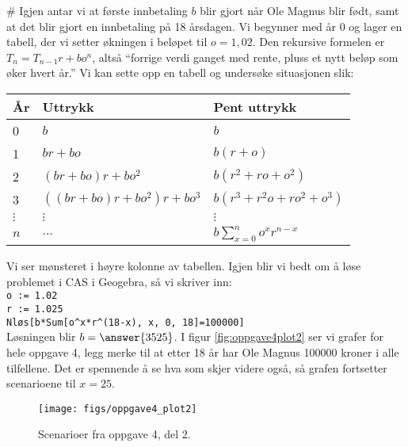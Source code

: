 \begin{easylist}[enumerate]
	# Igjen antar vi at første innbetaling $b$ blir gjort når Ole Magnus blir født, samt at det blir gjort en innbetaling på 18 årsdagen.
	Vi begynner med år 0 og lager en tabell, der vi setter økningen i beløpet til $o = 1,02$.
	Den rekursive formelen er $T_n = T_{n-1}r + bo^n$, altså ``forrige verdi ganget med rente, pluss et nytt beløp som øker hvert år.''
	Vi kan sette opp en tabell og undersøke situasjonen slik:
	\begin{center}
		\begin{tabular}{l|l|l}
			\textbf{År} & \textbf{Uttrykk} & \textbf{Pent uttrykk} \\ \hline
			0 & $b$ & $b$ \\
			1 & $br + bo$ & $b(r+o)$ \\
			2 & $\left(br + bo\right)r + bo^2$ & $b(r^2 + ro + o^2)$ \\
			3 & $\left( \left(br + bo\right)r + bo^2 \right)r + bo^3$ & $b(r^3 + r^2o + ro^2 + o^3)$ \\
			$\vdots$ & $\vdots$ & $\vdots$ \\
			$n$ & $\dots$ & $b \sum_{x = 0}^{n} o^x r^{n-x}$
		\end{tabular}
	\end{center}
	Vi ser mønsteret i høyre kolonne av tabellen.
	Igjen blir vi bedt om å løse problemet i CAS i Geogebra, så vi skriver inn: \\
	\texttt{o := 1.02} \\
	\texttt{r := 1.025} \\
	\texttt{Nløs[b*Sum[o\textasciicircum x*r\textasciicircum (18-x), x, 0, 18]=100000]} \\
	Løsningen blir $b = \answer{3525}$. I figur \eqref{fig:oppgave4plot2} ser vi grafer for hele oppgave 4, legg merke til at etter 18 år har Ole Magnus 100000 kroner i alle tilfellene. Det er spennende å se hva som skjer videre også, så grafen fortsetter scenarioene til $x=25$.
	\begin{figure}[th!]
		\centering
		\texttt{[image: figs/oppgave4\_plot2]}
		\caption{Scenarioer fra oppgave 4, del 2.}
		\label{fig:oppgave4plot2}
	\end{figure}
\end{easylist}







